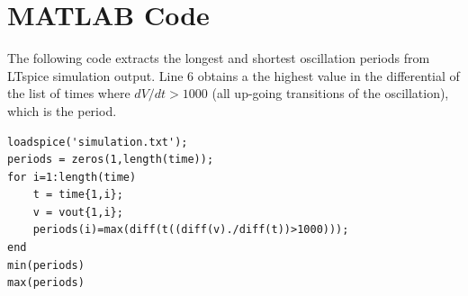 \documentclass{article}
\begin{document}
\appendix
\section{MATLAB Code}\label{code}
The following code extracts the longest and shortest oscillation periods from LTspice simulation output. Line 6 obtains a the highest value in the differential of the list of times where \(dV/dt>1000\) (all up-going transitions of the oscillation), which is the period.

\begin{verbatim}
loadspice('simulation.txt');
periods = zeros(1,length(time));
for i=1:length(time)
    t = time{1,i};
    v = vout{1,i};
    periods(i)=max(diff(t((diff(v)./diff(t))>1000)));
end
min(periods)
max(periods)
\end{verbatim}
\end{document}
